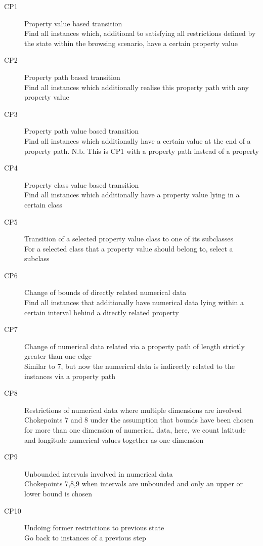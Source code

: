 \begin{description}
\item[CP1] Property value based transition\\
Find all instances which, additional to satisfying all restrictions defined by the state within the browsing scenario, have a certain property value
\item[CP2] Property path based transition\\
Find all instances which additionally realise this property path with any property value
\item[CP3] Property path value based transition\\
Find all instances which additionally have a certain value at the end of a property path.
N.b. This is CP1 with a property path instead of a property
\item[CP4] Property class value based transition\\
Find all instances which additionally have a property value lying in a certain class
\item[CP5] Transition of a selected property value class to one of its subclasses \\
For a selected class that a property value should belong to, select a subclass
\item[CP6] Change of bounds of directly related numerical data\\
Find all instances that additionally have numerical data lying within a certain interval behind a directly related property
\item[CP7] Change of numerical data related via a property path of length strictly greater than one edge\\
Similar to 7, but now the numerical data is indirectly related to the instances via a property path
\item[CP8] Restrictions of numerical data where multiple dimensions are involved\\
Chokepoints 7 and 8 under the assumption that bounds have been chosen for more than one dimension of numerical data, here, we count latitude and longitude numerical values together as one dimension
\item[CP9] Unbounded intervals involved in numerical data\\
Chokepoints 7,8,9 when intervals are unbounded and only an upper or lower bound is chosen
\item[CP10] Undoing former restrictions to previous state\\
Go back to instances of a previous step

\end{description}
